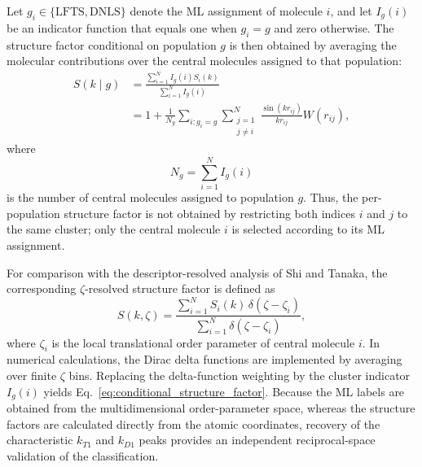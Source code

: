 \documentclass[aps, amsmath,amssymb, reprint, twocolumn, superscriptaddress]{revtex4-2}
\begin{document}
Let $g_i\in\{\mathrm{LFTS},\mathrm{DNLS}\}$ denote the ML assignment of molecule $i$, and let $I_g(i)$ be an indicator function that equals one when $g_i=g$ and zero otherwise. The structure factor conditional on population $g$ is then obtained by averaging the molecular contributions over the central molecules assigned to that population:
\begin{equation}
\begin{split}
S(k\mid g)
&=\frac{\sum_{i=1}^{N}I_g(i)S_i(k)}
{\sum_{i=1}^{N}I_g(i)}\\
&=1+
\frac{1}{N_g}
\sum_{i:g_i=g}
\sum_{\substack{j=1\\j\neq i}}^{N}
\frac{\sin(k r_{ij})}{k r_{ij}}W(r_{ij}),
\end{split}
\label{eq:conditional_structure_factor}
\end{equation}
where
\begin{equation}
N_g=\sum_{i=1}^{N}I_g(i)
\end{equation}
is the number of central molecules assigned to population $g$. Thus, the per-population structure factor is not obtained by restricting both indices $i$ and $j$ to the same cluster; only the central molecule $i$ is selected according to its ML assignment.

For comparison with the descriptor-resolved analysis of Shi and Tanaka, the corresponding $\zeta$-resolved structure factor is defined as
\begin{equation}
S(k,\zeta)=
\frac{
\sum_{i=1}^{N}S_i(k)\,
\delta\!\left(\zeta-\zeta_i\right)
}{
\sum_{i=1}^{N}
\delta\!\left(\zeta-\zeta_i\right)
},
\label{eq:zeta_resolved_structure_factor}
\end{equation}
where $\zeta_i$ is the local translational order parameter of central molecule $i$. In numerical calculations, the Dirac delta functions are implemented by averaging over finite $\zeta$ bins. Replacing the delta-function weighting by the cluster indicator $I_g(i)$ yields Eq.~\eqref{eq:conditional_structure_factor}. Because the ML labels are obtained from the multidimensional order-parameter space, whereas the structure factors are calculated directly from the atomic coordinates, recovery of the characteristic $k_{T1}$ and $k_{D1}$ peaks provides an independent reciprocal-space validation of the classification.

\FloatBarrier

\newpage


\end{document}
